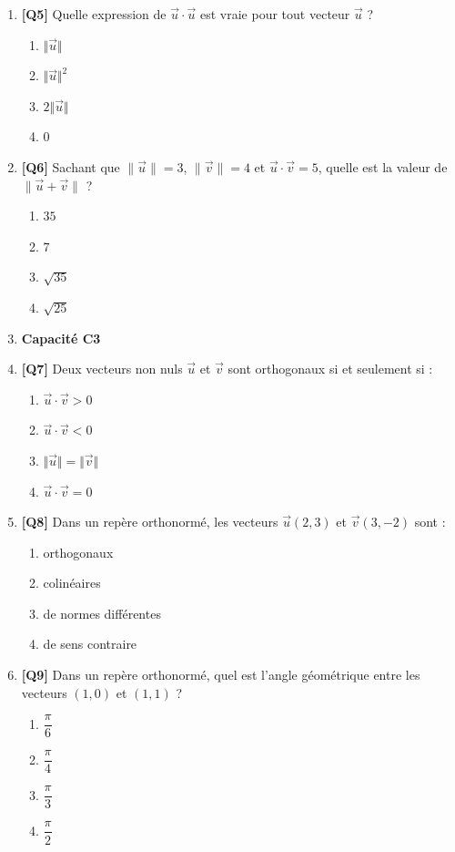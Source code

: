 \begin{enumerate}
\item \textbf{[Q5]} Quelle expression de $\vec u\cdot\vec u$ est vraie pour tout vecteur $\vec u$ ?
  \begin{enumerate}[label=\Alph*.]
    \item $\Vert\vec{u}\Vert$
    \item $\Vert\vec{u}\Vert^2$
    \item $2\Vert\vec{u}\Vert$
    \item $0$
  \end{enumerate}

\item \textbf{[Q6]} Sachant que $\|\vec{u}\|=3$, $\|\vec{v}\|=4$ et $\vec{u}\cdot\vec{v}=5$, quelle est la valeur de $\|\vec{u}+\vec{v}\|$ ?
  \begin{enumerate}[label=\Alph*.]
    \item $35$
    \item $7$
    \item $\sqrt{35}$
    \item $\sqrt{25}$
  \end{enumerate}

\item[] \textbf{Capacité C3}

\item \textbf{[Q7]} Deux vecteurs non nuls $\vec{u}$ et $\vec{v}$ sont orthogonaux si et seulement si :
  \begin{enumerate}[label=\Alph*.]
    \item $\vec{u}\cdot\vec{v} > 0$
    \item $\vec{u}\cdot\vec{v} < 0$
    \item $\Vert\vec{u}\Vert = \Vert\vec{v}\Vert$
    \item $\vec{u}\cdot\vec{v} = 0$
  \end{enumerate}

\item \textbf{[Q8]} Dans un repère orthonormé, les vecteurs $\vec{u}(2,3)$ et $\vec{v}(3,-2)$ sont :
  \begin{enumerate}[label=\Alph*.]
    \item orthogonaux
    \item colinéaires
    \item de normes différentes
    \item de sens contraire
  \end{enumerate}

\item \textbf{[Q9]} Dans un repère orthonormé, quel est l'angle géométrique entre les vecteurs $(1,0)$ et $(1,1)$ ?
  \begin{enumerate}[label=\Alph*.]
    \item $\dfrac{\pi}{6}$
    \item $\dfrac{\pi}{4}$
    \item $\dfrac{\pi}{3}$
    \item $\dfrac{\pi}{2}$
  \end{enumerate}


\end{enumerate}
